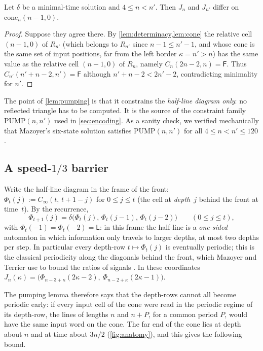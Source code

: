\begin{lemma}[pumping]\label{lem:pumping}
Let $\delta$ be a minimal-time solution and $4\le n<n'$. Then $J_n$ and
$J_{n'}$ differ on $\mathrm{cone}_n(n-1,0)$.
\end{lemma}

\begin{proof}
Suppose they agree there. By \cref{lem:determinacy,lem:cone} the relative
cell $(n-1,0)$ of $R_{n'}$ (which belongs to $R_{n'}$ since $n-1\le n'-1$,
and whose cone is the same set of input positions, far from the left border
$\kappa=n'>n$) has the same value as the relative cell $(n-1,0)$ of $R_n$,
namely $C_n(2n-2,n)=\mathsf F$. Thus $C_{n'}(n'+n-2,n')=\mathsf F$ although
$n'+n-2<2n'-2$, contradicting minimality for $n'$.
\end{proof}

The point of \cref{lem:pumping} is that it constrains the \emph{half-line
diagram only}: no reflected triangle has to be computed. It is the source of
the constraint family $\mathrm{PUMP}(n,n')$ used in \cref{sec:encoding}. As a
sanity check, we verified mechanically that Mazoyer's six-state solution
satisfies $\mathrm{PUMP}(n,n')$ for all $4\le n<n'\le120$.

\subsection{A speed-\texorpdfstring{$1/3$}{1/3} barrier}\label{sec:third}

Write the half-line diagram in the frame of the front:
$\Phi_t(j):=C_\infty(t,\,t+1-j)$ for $0\le j\le t$ (the cell at
\emph{depth}~$j$ behind the front at time~$t$). By the recurrence,
\begin{equation}\label{eq:comoving}
\Phi_{t+1}(j)=\delta\bigl(\Phi_t(j),\,\Phi_t(j-1),\,\Phi_t(j-2)\bigr)
\qquad(0\le j\le t),
\end{equation}
with $\Phi_t(-1)=\Phi_t(-2)=\mathsf L$: in this frame the half-line is a
\emph{one-sided} automaton in which information only travels to larger
depths, at most two depths per step. In particular every depth-row
$t\mapsto\Phi_t(j)$ is eventually periodic; this is the classical
periodicity along the diagonals behind the front, which Mazoyer and Terrier
use to bound the ratios of signals \cite[\S4]{MazoyerTerrier94}.
In these coordinates
$J_n(\kappa)=\bigl(\Phi_{n-3+\kappa}(2\kappa-2),\ \Phi_{n-2+\kappa}(2\kappa-1)\bigr)$.

The pumping lemma therefore says that the depth-rows cannot all become
periodic early: if every input cell of the cone were read in the periodic
regime of its depth-row, the lines of lengths $n$ and $n+P$, for a common
period $P$, would have the same input word on the cone. The far end of the
cone lies at depth about $n$ and at time about $3n/2$
(\cref{fig:anatomy}), and this gives the following bound.

